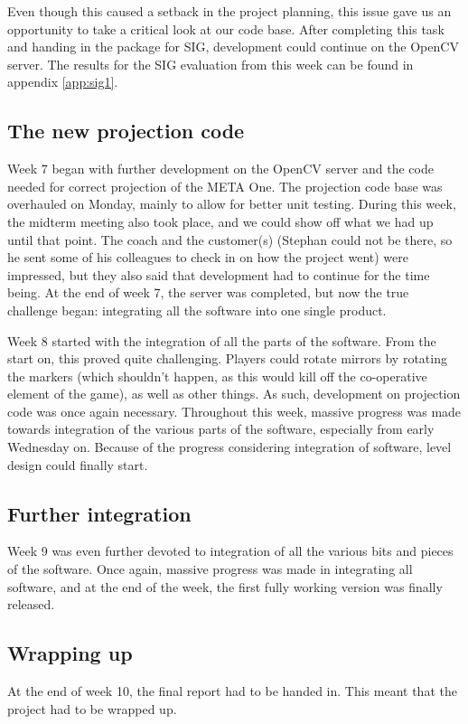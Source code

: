			Even though this caused a setback in the project planning, this issue
			gave us an opportunity to take a critical look at our code base. After
			completing this task and handing in the package for SIG, development 
			could continue on the OpenCV server. The results for the SIG evaluation
			from this week can be found in appendix \ref{app:sig1}.
		
		\subsection{The new projection code}
			Week 7 began with further development on the OpenCV server and the code
			needed for correct projection of the META One. The projection code base
			was overhauled on Monday, mainly to allow for better unit testing. During
			this week, the midterm meeting also took place, and we could show off
			what we had up until that point. The coach and the customer(s) (Stephan
			could not be there, so he sent some of his colleagues to check in on
			how the project went) were impressed, but they also said that development
			had to continue for the time being. At the end of week 7, the server was
			completed, but now the true challenge began: integrating all the software
			into one single product.
			
			Week 8 started with the integration of all the parts of the software.
			From the start on, this proved quite challenging. Players could rotate
			mirrors by rotating the markers (which shouldn't happen, as this would
			kill off the co-operative element of the game), as well as other things.
			As such, development on projection code was once again necessary.
			Throughout this week, massive progress was made towards integration of 
			the various parts of the software, especially from early Wednesday on.
			Because of the progress considering integration of software, level design
			could finally start.
		 
		\subsection{Further integration}
			Week 9 was even further devoted to integration of all the various bits and
			pieces of the software. Once again, massive progress was made in
			integrating all software, and at the end of the week, the first fully
			working version was finally released. 
		 
		\subsection{Wrapping up}
			At the end of week 10, the final report had to be handed in. This meant
			that the project had to be wrapped up.
		 
